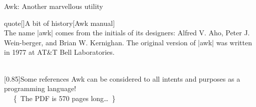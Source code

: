 
\begin{frame}{Awk: Another marvellous utility}
    \begin{varblock}{quote}[\textwidth]{A bit of history}[Awk manual]
        \textnormal{
            \\[1.5ex]
            The name \bash|awk| comes from the initials of its designers: Alfred V. Aho, Peter J. Wein-berger, and Brian W. Kernighan.
            The original version of \bash|awk| was written in \alert{1977} at AT\&T Bell Laboratories.
        }\\[-1ex] ~
    \end{varblock}
    \begin{varblock*}{}[0.85\textwidth]{Some references}
        Awk can be considered to all intents and purposes as a programming language!\\
        $\quad$ {\tiny\{~The PDF is \alert{570} pages long\ldots~\}}\\
        $\quad$
    \end{varblock*}
\end{frame}
